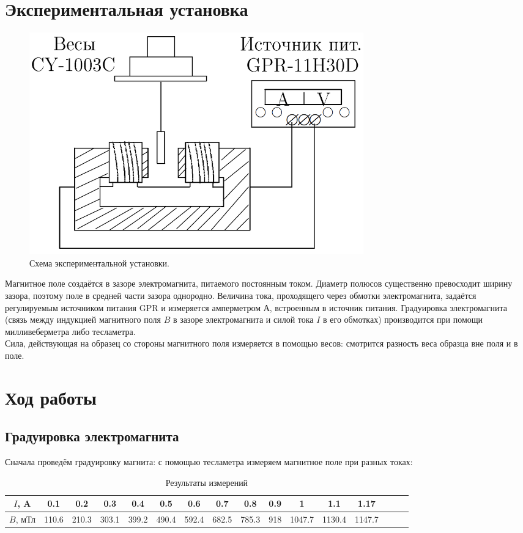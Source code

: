 \documentclass{lab}
\begin{document}
\section*{Экспериментальная установка}

\begin{figure}
    \centering
    \includegraphics[width = 0.7\textwidth, height = 0.3\textheight]{ustanovka.png}
    \caption{Схема экспериментальной установки.}
\end{figure}

Магнитное поле создаётся в зазоре электромагнита, питаемого постоянным током. Диаметр полюсов существенно превосходит ширину зазора, поэтому поле в средней части зазора однородно. Величина тока, проходящего через обмотки электромагнита, задаётся регулируемым источником питания GPR и измеряется амперметром $ А $, встроенным в источник питания. Градуировка электромагнита (связь между индукцией магнитного поля $ B $ в зазоре электромагнита и силой тока $ I $ в его обмотках) производится при помощи милливеберметра либо тесламетра.\\
Сила, действующая на образец со стороны магнитного поля измеряется в помощью весов: смотрится разность веса образца вне поля и в поле.

\section*{Ход работы}

\subsection*{Градуировка электромагнита}

Сначала проведём градуировку магнита: с помощью тесламетра измеряем магнитное поле при разных токах:

\begin{table}[H]
    \begin{center}
        \begin{tabular}{|c|*{15}{c|}}
            \hline
            $I$, A & 0.1 & 0.2 & 0.3 & 0.4 & 0.5 & 0.6 & 0.7 & 0.8 & 0.9 & 1 & 1.1 & 1.17 \\\hline
            $B$, мТл & 110.6 & 210.3 & 303.1 & 399.2 & 490.4 & 592.4 & 682.5 & 785.3 & 918 & 1047.7 & 1130.4 & 1147.7 \\\hline
        \end{tabular}
        \caption{Результаты измерений}
    \end{center}
\end{table}
\end{document}
